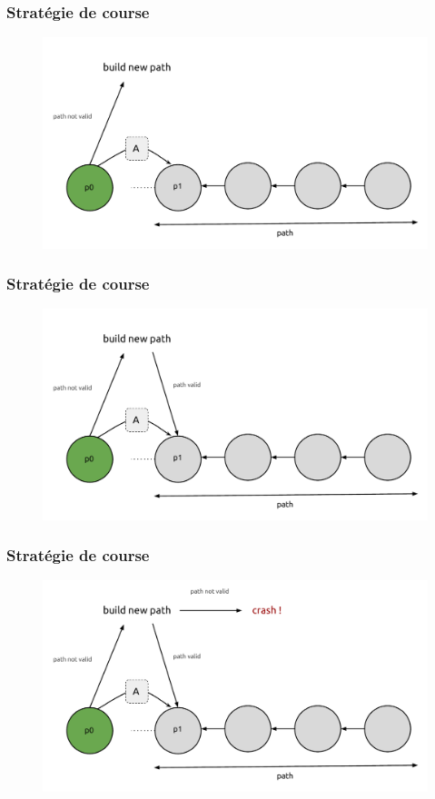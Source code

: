 \documentclass[c]{beamer}
\begin{document}
\begin{frame}[label=strategie4]
\transdissolve[duration=1]
\frametitle{Stratégie de course}
\begin{figure}[!h]
\centering
\includegraphics[scale=0.3]{fig/diag6.pdf}
\end{figure}
\end{frame}

\begin{frame}[label=strategie5]
\transdissolve[duration=1]
\frametitle{Stratégie de course}
\begin{figure}[!h]
\centering
\includegraphics[scale=0.3]{fig/diag7.pdf}
\end{figure}
\end{frame}

\begin{frame}[label=strategie6]
\transdissolve[duration=1]
\frametitle{Stratégie de course}
\begin{figure}[!h]
\centering
\includegraphics[scale=0.3]{fig/diag8.pdf}
\end{figure}
\end{frame}
\end{document}
